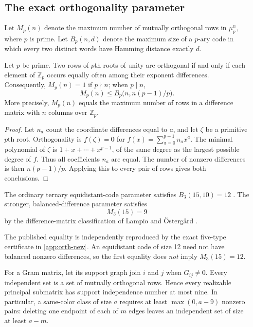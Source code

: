 \subsection{The exact orthogonality parameter}
Let $M_p(n)$ denote the maximum number of mutually orthogonal rows in $\mu_p^n$, where $p$ is prime. Let $B_p(n,d)$ denote the maximum size of a $p$-ary code in which every two distinct words have Hamming distance exactly $d$.
\begin{proposition}\label{prop:prime-code}
Let $p$ be prime. Two rows of $p$th roots of unity are orthogonal if and only if each element of $\mathbb Z_p$ occurs equally often among their exponent differences. Consequently, $M_p(n)=1$ if $p\nmid n$; when $p\mid n$,
\[
 M_p(n)\le B_p\bigl(n,n(p-1)/p\bigr).
\]
More precisely, $M_p(n)$ equals the maximum number of rows in a difference matrix with $n$ columns over $\mathbb Z_p$.
\end{proposition}
\begin{proof}
Let $n_a$ count the coordinate differences equal to $a$, and let $\zeta$ be a primitive $p$th root. Orthogonality is $f(\zeta)=0$ for $f(x)=\sum_{a=0}^{p-1}n_ax^a$. The minimal polynomial of $\zeta$ is $1+x+\cdots+x^{p-1}$, of the same degree as the largest possible degree of $f$. Thus all coefficients $n_a$ are equal. The number of nonzero differences is then $n(p-1)/p$. Applying this to every pair of rows gives both conclusions.
\end{proof}

\begin{theorem}\label{thm:orthogonality}
The ordinary ternary equidistant-code parameter satisfies $B_3(15,10)=12$ \cite{TB}. The stronger, balanced-difference parameter satisfies
\[
 M_3(15)=9
\]
by the difference-matrix classification of Lampio and \"Osterg\aa rd \cite{LO}.
\end{theorem}
The published equality is independently reproduced by the exact five-type certificate in \cref{app:orth-new}. An equidistant code of size 12 need not have balanced nonzero differences, so the first equality does \emph{not} imply $M_3(15)=12$.

For a Gram matrix, let its support graph join $i$ and $j$ when $G_{ij}\ne0$. Every independent set is a set of mutually orthogonal rows. Hence every realizable principal submatrix has support independence number at most nine. In particular, a same-color class of size $a$ requires at least $\max(0,a-9)$ nonzero pairs: deleting one endpoint of each of $m$ edges leaves an independent set of size at least $a-m$.

